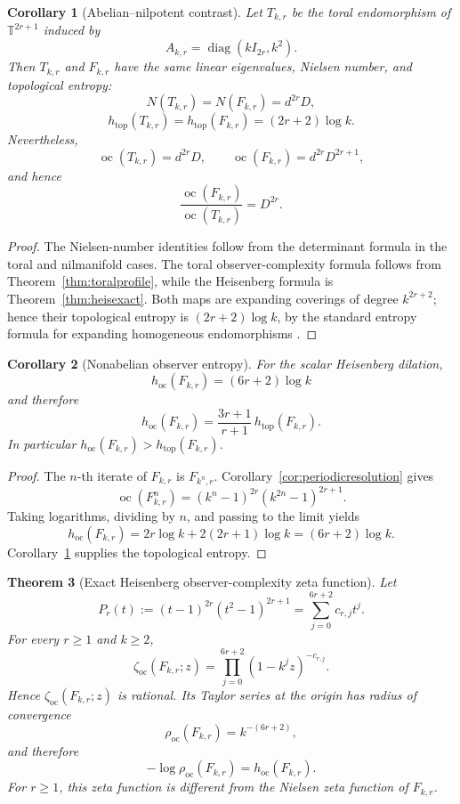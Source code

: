 \documentclass[11pt]{article}
\newtheorem{theorem}{Theorem}[section]
\newtheorem{corollary}[theorem]{Corollary}
\DeclareMathOperator{\oc}{oc}
\newcommand{\zetaoc}{\zeta_{\mathrm{oc}}}
\newcommand{\T}{\mathbb T}
\begin{document}
\begin{corollary}[Abelian--nilpotent contrast]
\label{cor:contrast}
Let $T_{k,r}$ be the toral endomorphism of $\T^{2r+1}$ induced by
\[
  A_{k,r}=\operatorname{diag}(kI_{2r},k^2).
\]
Then $T_{k,r}$ and $F_{k,r}$ have the same linear eigenvalues, Nielsen number,
and topological entropy:
\[
  N(T_{k,r})=N(F_{k,r})=d^{2r}D,
\]
\[
  h_{\mathrm{top}}(T_{k,r})
  =h_{\mathrm{top}}(F_{k,r})
  =(2r+2)\log k.
\]
Nevertheless,
\[
  \oc(T_{k,r})=d^{2r}D,
  \qquad
  \oc(F_{k,r})=d^{2r}D^{2r+1},
\]
and hence
\[
  \frac{\oc(F_{k,r})}{\oc(T_{k,r})}=D^{2r}.
\]
\end{corollary}

\begin{proof}
The Nielsen-number identities follow from the determinant formula in the
toral and nilmanifold cases.  The toral observer-complexity formula follows
from Theorem~\ref{thm:toralprofile}, while the Heisenberg formula is
Theorem~\ref{thm:heisexact}.  Both maps are expanding coverings of degree
$k^{2r+2}$; hence their topological entropy is $(2r+2)\log k$, by the standard
entropy formula for expanding homogeneous endomorphisms \cite{Bowen}.
\end{proof}

\begin{corollary}[Nonabelian observer entropy]
\label{cor:heisentropy}
For the scalar Heisenberg dilation,
\[
  h_{\mathrm{oc}}(F_{k,r})=(6r+2)\log k
\]
and therefore
\[
  \boxed{
  h_{\mathrm{oc}}(F_{k,r})
  =\frac{3r+1}{r+1}\,h_{\mathrm{top}}(F_{k,r}).}
\]
In particular $h_{\mathrm{oc}}(F_{k,r})>h_{\mathrm{top}}(F_{k,r})$.
\end{corollary}

\begin{proof}
The $n$-th iterate of $F_{k,r}$ is $F_{k^n,r}$.  Corollary~\ref{cor:periodicresolution} gives
\[
  \oc(F_{k,r}^n)
  =(k^n-1)^{2r}(k^{2n}-1)^{2r+1}.
\]
Taking logarithms, dividing by $n$, and passing to the limit yields
\[
  h_{\mathrm{oc}}(F_{k,r})
  =2r\log k+2(2r+1)\log k
  =(6r+2)\log k.
\]
Corollary~\ref{cor:contrast} supplies the topological entropy.
\end{proof}


\begin{theorem}[Exact Heisenberg observer-complexity zeta function]
\label{thm:heiszeta}
Let
\[
  P_r(t):=(t-1)^{2r}(t^2-1)^{2r+1}
  =\sum_{j=0}^{6r+2}c_{r,j}t^j.
\]
For every $r\ge1$ and $k\ge2$,
\[
  \boxed{
  \zetaoc(F_{k,r};z)
  =\prod_{j=0}^{6r+2}(1-k^jz)^{-c_{r,j}}.}
\]
Hence $\zetaoc(F_{k,r};z)$ is rational.  Its Taylor series at the origin has
radius of convergence
\[
  \boxed{\rho_{\mathrm{oc}}(F_{k,r})=k^{-(6r+2)}},
\]
and therefore
\[
  -\log\rho_{\mathrm{oc}}(F_{k,r})
  =h_{\mathrm{oc}}(F_{k,r}).
\]
For $r\ge1$, this zeta function is different from the Nielsen zeta function
of $F_{k,r}$.
\end{theorem}
\end{document}
